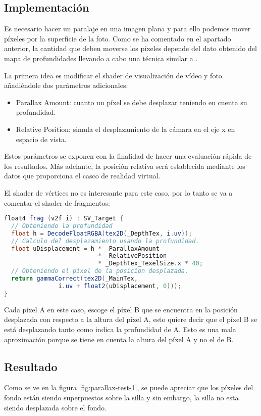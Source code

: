 \subsection{Implementación} 
Es necesario hacer un paralaje en una imagen plana y para ello podemos mover píxeles por la superficie de la foto. Como se ha comentado en el apartado anterior, la cantidad que deben moverse los píxeles depende del dato obtenido del mapa de profundidades llevando a cabo una técnica similar a \cite{PedroParallax}.

La primera idea es modificar el shader de visualización de vídeo y foto añadiéndole dos parámetros adicionales:

\begin{itemize}
\item Parallax Amount: cuanto un píxel se debe desplazar teniendo en cuenta su profundidad.
\item Relative Position: simula el desplazamiento de la cámara en el eje x en espacio de vista.
\end{itemize}

Estos parámetros se exponen con la finalidad de hacer una evaluación rápida de los resultados. Más adelante, la posición relativa será establecida mediante los datos que proporciona el casco de realidad virtual.

El shader de vértices no es interesante para este caso, por lo tanto se va a comentar el shader de fragmentos:

\begin{lstlisting}[language=glsl]
float4 frag (v2f i) : SV_Target {
  // Obteniendo la profundidad
  float h = DecodeFloatRGBA(tex2D(_DepthTex, i.uv));
  // Calculo del desplazamiento usando la profundidad.
  float uDisplacement = h * _ParallaxAmount 
                          * _RelativePosition 
                          * _DepthTex_TexelSize.x * 40;
  // Obteniendo el pixel de la posicion desplazada.
  return gammaCorrect(tex2D(_MainTex, 
               i.uv + float2(uDisplacement, 0)));
}
\end{lstlisting}

Cada píxel A en este caso, escoge el píxel B que se encuentra en la posición desplazada con respecto a la altura del píxel A, esto quiere decir que el píxel B se está desplazando tanto como indica la profundidad de A. Esto es una mala aproximación porque se tiene en cuenta la altura del píxel A y no el de B.


\subsection{Resultado}
Como se ve en la figura \ref{fig:parallax-test-1}, se puede apreciar que los píxeles del fondo están siendo superpuestos sobre la silla y sin embargo, la silla no esta siendo desplazada sobre el fondo.


